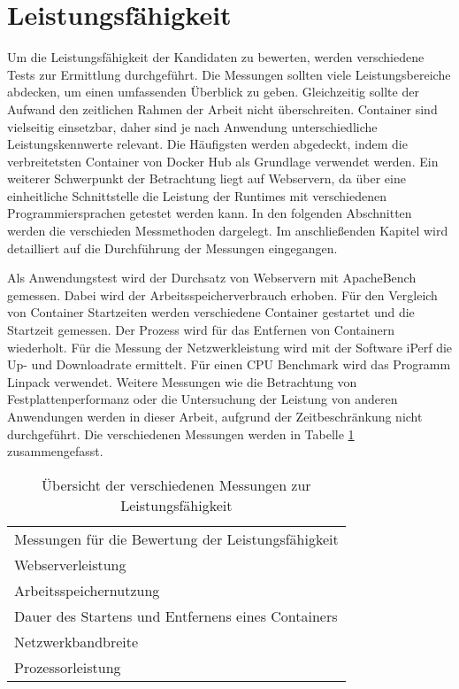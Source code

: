 \section{Leistungsfähigkeit}
Um die Leistungsfähigkeit der Kandidaten zu bewerten, werden verschiedene Tests zur Ermittlung durchgeführt. Die Messungen sollten viele Leistungsbereiche abdecken, um einen umfassenden Überblick zu geben. Gleichzeitig sollte der Aufwand den zeitlichen Rahmen der Arbeit nicht überschreiten.
Container sind vielseitig einsetzbar, daher sind je nach Anwendung unterschiedliche Leistungskennwerte relevant. Die Häufigsten werden abgedeckt, indem die verbreitetsten Container von Docker Hub als Grundlage verwendet werden.
Ein weiterer Schwerpunkt der Betrachtung liegt auf Webservern, da über eine einheitliche Schnittstelle die Leistung der Runtimes mit verschiedenen Programmiersprachen getestet werden kann. In den folgenden Abschnitten werden die verschieden Messmethoden dargelegt. Im anschließenden Kapitel wird detailliert auf die Durchführung der Messungen eingegangen. 

Als Anwendungstest wird der Durchsatz von Webservern mit ApacheBench gemessen. Dabei wird der Arbeitsspeicherverbrauch erhoben. Für den Vergleich von Container Startzeiten werden verschiedene Container gestartet und die Startzeit gemessen. Der Prozess wird für das Entfernen von Containern wiederholt. Für die Messung der Netzwerkleistung wird mit der Software iPerf die Up- und Downloadrate ermittelt. Für einen CPU Benchmark wird das Programm Linpack verwendet. Weitere Messungen wie die Betrachtung von Festplattenperformanz oder die Untersuchung der Leistung von anderen Anwendungen werden in dieser Arbeit, aufgrund der Zeitbeschränkung nicht durchgeführt. Die verschiedenen Messungen werden in Tabelle \ref{tbl:messungen} zusammengefasst.

\begin{table}[hbt]
	\myfloatalign
	\small
	\begin{tabularx}{\textwidth}{X} \hline
		\spacedlowsmallcaps{Messungen für die Bewertung der Leistungsfähigkeit} \\ \hline
		Messungen für die Bewertung der Leistungsfähigkeit \\
		Webserverleistung                                   \\
		Arbeitsspeichernutzung                               \\
		Dauer des Startens und Entfernens eines Containers  \\
		Netzwerkbandbreite                                  \\
		Prozessorleistung                                   \\
		\hline
	\end{tabularx}
	\caption[Messungen zur Leistungsfähigkeit]{Übersicht der verschiedenen Messungen zur Leistungsfähigkeit}
	\label{tbl:messungen}
\end{table}

